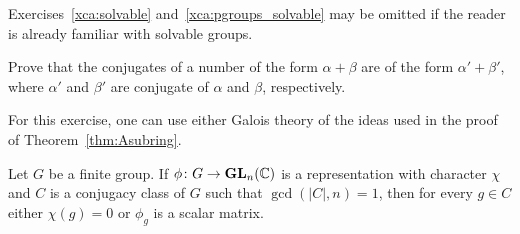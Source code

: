 Exercises~\ref{xca:solvable} and~\ref{xca:pgroups_solvable} may be omitted if the reader is already familiar with solvable groups.

\begin{exercise}
\label{xca:conjugates}
    Prove that the conjugates of 
    a number of the form $\alpha+\beta$ are of the form
    $\alpha'+\beta'$, where $\alpha'$ 
    and $\beta'$ are conjugate of $\alpha$ and $\beta$, respectively.  
\end{exercise}

For this exercise, one can use either 
Galois theory of the ideas used in the proof of Theorem~\ref{thm:Asubring}. 

\begin{theorem}[Burnside]
	\label{thm:Burnside_auxiliar}
	Let $G$ be a finite group. If $\phi\colon G\to\mathbf{GL}_n(\mathbb{C})$ is a representation
	with character $\chi$ and $C$ is a conjugacy class of $G$ such that 
	$\gcd(|C|,n)=1$, then for every $g\in C$ either 
	$\chi(g)=0$ or $\phi_g$ is a scalar matrix. 
\end{theorem}





